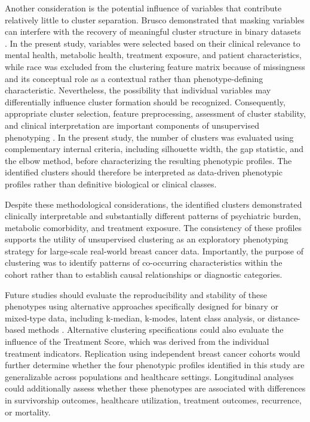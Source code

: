 \documentclass[11pt]{article}
\begin{document}
Another consideration is the potential influence of variables that contribute relatively little to cluster separation. Brusco demonstrated that masking variables can interfere with the recovery of meaningful cluster structure in binary datasets \cite{Brusco2004}. In the present study, variables were selected based on their clinical relevance to mental health, metabolic health, treatment exposure, and patient characteristics, while race was excluded from the clustering feature matrix because of missingness and its conceptual role as a contextual rather than phenotype-defining characteristic. Nevertheless, the possibility that individual variables may differentially influence cluster formation should be recognized. Consequently, appropriate cluster selection, feature preprocessing, assessment of cluster stability, and clinical interpretation are important components of unsupervised phenotyping \cite{phenotypeclusteringhealthcare}. In the present study, the number of clusters was evaluated using complementary internal criteria, including silhouette width, the gap statistic, and the elbow method, before characterizing the resulting phenotypic profiles. The identified clusters should therefore be interpreted as data-driven phenotypic profiles rather than definitive biological or clinical classes.

Despite these methodological considerations, the identified clusters demonstrated clinically interpretable and substantially different patterns of psychiatric burden, metabolic comorbidity, and treatment exposure. The consistency of these profiles supports the utility of unsupervised clustering as an exploratory phenotyping strategy for large-scale real-world breast cancer data. Importantly, the purpose of clustering was to identify patterns of co-occurring characteristics within the cohort rather than to establish causal relationships or diagnostic categories.

Future studies should evaluate the reproducibility and stability of these phenotypes using alternative approaches specifically designed for binary or mixed-type data, including k-median, k-modes, latent class analysis, or distance-based methods \cite{Brusco2017,Smieja2019,Dorman2022}. Alternative clustering specifications could also evaluate the influence of the Treatment Score, which was derived from the individual treatment indicators. Replication using independent breast cancer cohorts would further determine whether the four phenotypic profiles identified in this study are generalizable across populations and healthcare settings. Longitudinal analyses could additionally assess whether these phenotypes are associated with differences in survivorship outcomes, healthcare utilization, treatment outcomes, recurrence, or mortality.
\end{document}
